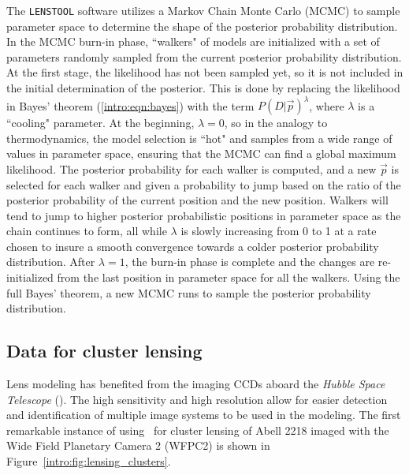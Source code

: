 The \texttt{LENSTOOL} software utilizes a Markov Chain Monte Carlo (MCMC) to sample parameter space to determine the shape of the posterior probability distribution. In the MCMC burn-in phase, ``walkers" of models are initialized with a set of parameters randomly sampled from the current posterior probability distribution. At the first stage, the likelihood has not been sampled yet, so it is not included in the initial determination of the posterior. This is done by replacing the likelihood in Bayes' theorem (\ref{intro:eqn:bayes}) with the term $P(D | \vec{p} )^\lambda$, where $\lambda$ is a ``cooling" parameter. At the beginning, $\lambda=0$, so in the analogy to thermodynamics, the model selection is ``hot" and samples from a wide range of values in parameter space, ensuring that the MCMC can find a global maximum likelihood. The posterior probability for each walker is computed, and a new $\vec{p}$ is selected for each walker and given a probability to jump based on the ratio of the posterior probability of the current position and the new position. Walkers will tend to jump to higher posterior probabilistic positions in parameter space as the chain continues to form, all while $\lambda$ is slowly increasing from 0 to 1 at a rate chosen to insure a smooth convergence towards a colder posterior probability distribution. After $\lambda=1$, the burn-in phase is complete and the changes are re-initialized from the last position in parameter space for all the walkers. Using the full Bayes' theorem, a new MCMC runs to sample the posterior probability distribution.

\subsection{Data for cluster lensing}

Lens modeling has benefited from the imaging CCDs aboard the {\it Hubble Space Telescope} (\hst). The high sensitivity and high resolution allow for easier detection and identification of multiple image systems to be used in the modeling. The first remarkable instance of using \hst\ for cluster lensing of Abell 2218 \citep{Kneib:1996kb} imaged with the Wide Field Planetary Camera 2 (WFPC2) is shown in Figure~\ref{intro:fig:lensing_clusters}. 

